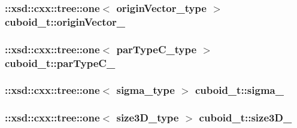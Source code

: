 \hypertarget{classcuboid__t_aa74b198d17ccc0d095655adf9cfa312b}{
\subsubsection[{origin\-Vector\-\_\-}]{\setlength{\rightskip}{0pt plus 5cm}\-::xsd\-::cxx\-::tree\-::one$<$ {\bf origin\-Vector\-\_\-type} $>$ cuboid\-\_\-t\-::origin\-Vector\-\_\-\hspace{0.3cm}{\ttfamily [protected]}}}\label{classcuboid__t_aa74b198d17ccc0d095655adf9cfa312b}
\hypertarget{classcuboid__t_a0ce3a150a7054afaab0b4cfb600b5920}{
\subsubsection[{par\-Type\-C\-\_\-}]{\setlength{\rightskip}{0pt plus 5cm}\-::xsd\-::cxx\-::tree\-::one$<$ {\bf par\-Type\-C\-\_\-type} $>$ cuboid\-\_\-t\-::par\-Type\-C\-\_\-\hspace{0.3cm}{\ttfamily [protected]}}}\label{classcuboid__t_a0ce3a150a7054afaab0b4cfb600b5920}
\hypertarget{classcuboid__t_ad68ee2b884c2bdec543177f9b2027021}{
\subsubsection[{sigma\-\_\-}]{\setlength{\rightskip}{0pt plus 5cm}\-::xsd\-::cxx\-::tree\-::one$<$ {\bf sigma\-\_\-type} $>$ cuboid\-\_\-t\-::sigma\-\_\-\hspace{0.3cm}{\ttfamily [protected]}}}\label{classcuboid__t_ad68ee2b884c2bdec543177f9b2027021}
\hypertarget{classcuboid__t_afccbf21e84c29d7cc05cadf8d5945856}{
\subsubsection[{size3\-D\-\_\-}]{\setlength{\rightskip}{0pt plus 5cm}\-::xsd\-::cxx\-::tree\-::one$<$ {\bf size3\-D\-\_\-type} $>$ cuboid\-\_\-t\-::size3\-D\-\_\-\hspace{0.3cm}{\ttfamily [protected]}}}\label{classcuboid__t_afccbf21e84c29d7cc05cadf8d5945856}
